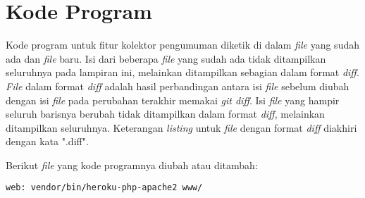 \chapter{Kode Program}
\label{lamp:A}

Kode program untuk fitur kolektor pengumuman diketik di dalam \textit{file} yang sudah ada dan \textit{file} baru. Isi dari beberapa \textit{file} yang sudah ada tidak ditampilkan seluruhnya pada lampiran ini, melainkan ditampilkan sebagian dalam format \textit{diff}. \textit{File} dalam format \textit{diff} adalah hasil perbandingan antara isi \textit{file} sebelum diubah dengan isi \textit{file} pada perubahan terakhir memakai \textit{git diff}. Isi \textit{file} yang hampir seluruh barisnya berubah tidak ditampilkan dalam format \textit{diff}, melainkan ditampilkan seluruhnya. Keterangan \textit{listing} untuk \textit{file} dengan format \textit{diff} diakhiri dengan kata ".diff".

Berikut \textit{file} yang kode programnya diubah atau ditambah:



\begin{lstlisting}[caption=Procfile]
web: vendor/bin/heroku-php-apache2 www/
\end{lstlisting}

















